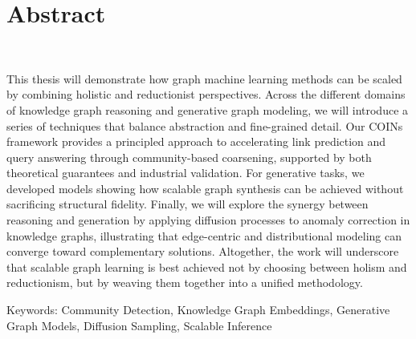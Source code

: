 

\cleardoublepage
\chapter*{Abstract}
~\newline~\newline~
This thesis will demonstrate how graph machine learning methods can be scaled by combining holistic and reductionist perspectives. Across the different domains of knowledge graph reasoning and generative graph modeling, we will introduce a series of techniques that balance abstraction and fine-grained detail. Our COINs framework provides a principled approach to accelerating link prediction and query answering through community-based coarsening, supported by both theoretical guarantees and industrial validation. For generative tasks, we developed models showing how scalable graph synthesis can be achieved without sacrificing structural fidelity. Finally, we will explore the synergy between reasoning and generation by applying diffusion processes to anomaly correction in knowledge graphs, illustrating that edge-centric and distributional modeling can converge toward complementary solutions. Altogether, the work will underscore that scalable graph learning is best achieved not by choosing between holism and reductionism, but by weaving them together into a unified methodology.

\vskip0.5cm
Keywords: Community Detection, Knowledge Graph Embeddings, Generative Graph Models, Diffusion Sampling, Scalable Inference








